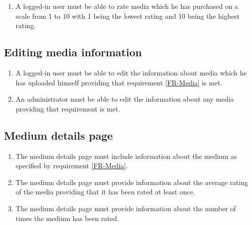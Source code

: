\documentclass[../report.tex]{subfiles}
\begin{document}
\begin{enumerate}[label=FR-\twodigits*, resume]
	\item A logged-in user must be able to rate media which he has purchased on a scale from 1 to 10 with 1 being the lowest rating and 10 being the highest rating.
\end{enumerate}
		
\subsection{Editing media information}

\begin{enumerate}[label=FR-\twodigits*, resume]
	\item A logged-in user must be able to edit the information about media which he has uploaded himself providing that requirement \ref{FR-Media} is met.
	\item An administrator must be able to edit the information about any media providing that requirement  is met.
\end{enumerate}
			
\subsection {Medium details page}

\begin{enumerate}[label=FR-\twodigits*, resume]
	\item The medium details page must include information about the medium as specified by requirement \ref{FR-Media}.
	\item The medium details page must provide information about the average rating of the media providing that it has been rated at least once.
	\item The medium details page must provide information about the number of times the medium has been rated.
\end{enumerate}
			
\end{document}
